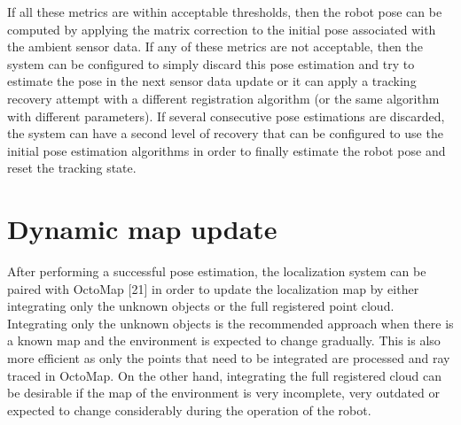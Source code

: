 If all these metrics are within acceptable thresholds, then the robot pose can be computed by applying the matrix correction to the initial pose associated with the ambient sensor data. If any of these metrics are not acceptable, then the system can be configured to simply discard this pose estimation and try to estimate the pose in the next sensor data update or it can apply a tracking recovery attempt with a different registration algorithm (or the same algorithm with different parameters). If several consecutive pose estimations are discarded, the system can have a second level of recovery that can be configured to use the initial pose estimation algorithms in order to finally estimate the robot pose and reset the tracking state.



\section{Dynamic map update}

After performing a successful pose estimation, the localization system can be paired with OctoMap [21] in order to update the localization map by either integrating only the unknown objects or the full registered point cloud. Integrating only the unknown objects is the recommended approach when there is a known map and the environment is expected to change gradually. This is also more efficient as only the points that need to be integrated are processed and ray traced in OctoMap. On the other hand, integrating the full registered cloud can be desirable if the map of the environment is very incomplete, very outdated or expected to change considerably during the operation of the robot.
